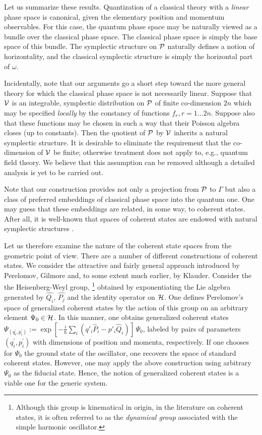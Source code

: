 \documentclass[12pt,aps,eqsecnum,tighten,nofootinbib]{revtex4-2}
\def\H{{\cal H}}
\def\P{{\cal P}}
\def\w{\omega}
\begin{document}
Let us summarize these results.  Quantization of a classical theory
with a {\em linear} phase space is canonical, given the elementary
position and momentum observables.  For this case, the quantum phase
space may be naturally viewed as a bundle over the classical phase
space.  The classical phase space is simply the base space of this
bundle.  The symplectic structure on $\P$ naturally defines a notion
of horizontality, and the classical symplectic structure is simply the
horizontal part of $\w$.

Incidentally, note that our arguments go a short step toward the more
general theory for which the classical phase space is not necessarily
linear.  Suppose that ${\cal V}$ is an integrable, symplectic
distribution on $\P$ of finite co-dimension $2n$ which may be
specified {\em locally} by the constancy of functions $f_r, r=1 \ldots
2n$.  Suppose also that these functions may be chosen in such a way
that their Poisson algebra closes (up to constants).  Then the
quotient of $\P$ by ${\cal V}$ inherits a natural symplectic
structure.  It is desirable to eliminate the requirement that the
co-dimension of ${\cal V}$ be finite; otherwise treatment does not
apply to, e.g., quantum field theory.  We believe that this assumption
can be removed although a detailed analysis is yet to be carried out.

Note that our construction provides not only a projection from $\P$ to
$\Gamma$ but also a class of preferred embeddings of classical phase
space into the quantum one.  One may guess that these embeddings are
related, in some way, to coherent states.  After all, it is well-known
that spaces of coherent states are endowed with natural symplectic
structures \cite{zhang,perelomov}.

Let us therefore examine the nature of the coherent state spaces from
the geometric point of view.  There are a number of different
constructions of coherent states.  We consider the attractive and
fairly general approach introduced by Perelomov\cite{perelomov1},
Gilmore\cite{gilmore} and, to some extent much earlier, by
Klauder\cite{klauder}. Consider the the Heisenberg-Weyl group,%
%
\footnote{Although this group is kinematical in origin, in
the literature on coherent states, it is often referred to as the
{\em dynamical group} associated with the simple harmonic oscillator.}
%
obtained by exponentiating the Lie algebra generated by $\hat{Q_i}$,
$\hat{P_j}$ and the identity operator on $\H$.  One defines
Perelomov's space of generalized coherent states by the action of this
group on an arbitrary element $\Psi_0 \in \H$. In this manner, one
obtains generalized coherent states $\Psi_{(q^\prime_i, p^\prime_i)}
:= \exp[ -\frac{i}{\hbar}\sum_i(q'_i\hat{P}_i - p'_i\hat{Q}_i)]\, \Psi_0$,
labeled by pairs of parameters $(q^\prime_i, p^\prime_i)$ with
dimensions of position and momenta, respectively.  If one chooses for
$\Psi_0$ the ground state of the oscillator, one recovers the space of
standard coherent states.  However, one may apply the above
construction using arbitrary $\Psi_0$ as the fiducial state. Hence,
the notion of generalized coherent states is a viable one for the
generic system.
\end{document}
